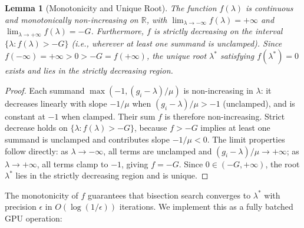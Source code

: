 \documentclass[11pt]{article}
\newtheorem{lemma}[theorem]{Lemma}
\theoremstyle{definition}
\theoremstyle{remark}
\newcommand{\R}{\mathbb{R}}
\begin{document}
\begin{lemma}[Monotonicity and Unique Root]
\label{lem:monotonicity}
The function $f(\lambda)$ is continuous and monotonically non-increasing on $\R$, with $\lim_{\lambda \to -\infty} f(\lambda) = +\infty$ and $\lim_{\lambda \to +\infty} f(\lambda) = -G$. Furthermore, $f$ is \emph{strictly} decreasing on the interval $\{\lambda : f(\lambda) > -G\}$ (i.e., wherever at least one summand is unclamped). Since $f(-\infty) = +\infty > 0 > -G = f(+\infty)$, the unique root $\lambda^*$ satisfying $f(\lambda^*) = 0$ exists and lies in the strictly decreasing region.
\end{lemma}

\begin{proof}
Each summand $\max(-1, (g_i - \lambda)/\mu)$ is non-increasing in $\lambda$: it decreases linearly with slope $-1/\mu$ when $(g_i - \lambda)/\mu > -1$ (unclamped), and is constant at $-1$ when clamped. Their sum $f$ is therefore non-increasing. Strict decrease holds on $\{\lambda : f(\lambda) > -G\}$, because $f > -G$ implies at least one summand is unclamped and contributes slope $-1/\mu < 0$. The limit properties follow directly: as $\lambda \to -\infty$, all terms are unclamped and $(g_i - \lambda)/\mu \to +\infty$; as $\lambda \to +\infty$, all terms clamp to $-1$, giving $f = -G$. Since $0 \in (-G, +\infty)$, the root $\lambda^*$ lies in the strictly decreasing region and is unique.
\end{proof}

The monotonicity of $f$ guarantees that bisection search converges to $\lambda^*$ with precision $\epsilon$ in $O(\log(1/\epsilon))$ iterations. We implement this as a fully batched GPU operation:
\end{document}
